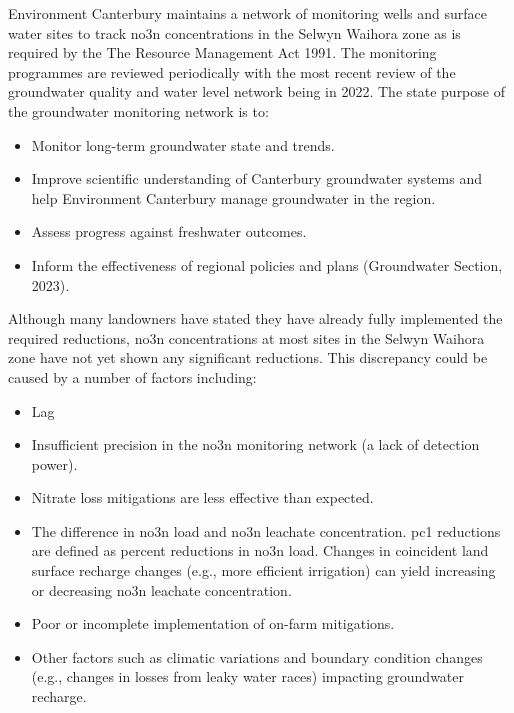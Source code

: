 Environment Canterbury maintains a network of monitoring wells and surface water sites to track \gls{no3n} concentrations in the Selwyn Waihora zone as is required by the The Resource Management Act 1991.
The monitoring programmes are reviewed periodically with the most recent review of the groundwater quality and water level network being in 2022.
The state purpose of the groundwater monitoring network is to:
\begin{itemize}
    \item Monitor long-term groundwater state and trends.
    \item Improve scientific understanding of Canterbury groundwater systems and help Environment Canterbury manage groundwater in the region.
    \item Assess progress against freshwater outcomes.
    \item Inform the effectiveness of regional policies and plans (Groundwater Section, 2023).
\end{itemize}


Although many landowners have stated they have already fully implemented the required reductions\citep{scottpc}, \gls{no3n} concentrations at most sites in the Selwyn Waihora zone have not yet shown any significant reductions\citep{scottpc}.
This discrepancy could be caused by a number of factors including:
\begin{itemize}
    \item Lag
    \item Insufficient precision in the \gls{no3n} monitoring network (a lack of detection power).
    \item Nitrate loss mitigations are less effective than expected.
    \item The difference in \gls{no3n} load and \gls{no3n} leachate concentration. \gls{pc1} reductions are defined as percent reductions in \gls{no3n} load. Changes in coincident land surface recharge changes (e.g., more efficient irrigation) can yield increasing or decreasing \gls{no3n} leachate concentration.
    \item Poor or incomplete implementation of on-farm mitigations.
    \item Other factors such as climatic variations and boundary condition changes (e.g., changes in losses from leaky water races) impacting groundwater recharge.
\end{itemize}

